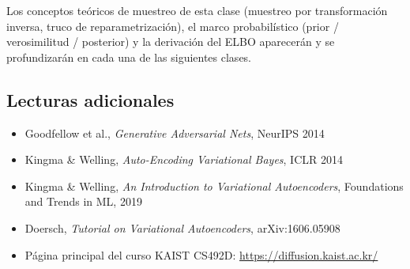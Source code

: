 \documentclass[a4paper]{article}
\begin{document}
Los conceptos teóricos de muestreo de esta clase (muestreo por transformación inversa, truco de reparametrización), el marco probabilístico (prior / verosimilitud / posterior) y la derivación del ELBO aparecerán y se profundizarán en cada una de las siguientes clases.

\subsection{Lecturas adicionales}

\begin{itemize}
    \item Goodfellow et al., \textit{Generative Adversarial Nets}, NeurIPS 2014
    \item Kingma \& Welling, \textit{Auto-Encoding Variational Bayes}, ICLR 2014
    \item Kingma \& Welling, \textit{An Introduction to Variational Autoencoders}, Foundations and Trends in ML, 2019
    \item Doersch, \textit{Tutorial on Variational Autoencoders}, arXiv:1606.05908
    \item Página principal del curso KAIST CS492D: \url{https://diffusion.kaist.ac.kr/}
\end{itemize}

\end{document}
